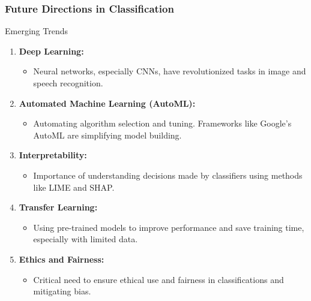 \documentclass[aspectratio=169]{beamer}
\begin{document}
\begin{frame}[fragile]
    \frametitle{Future Directions in Classification}
    \begin{block}{Emerging Trends}
        \begin{enumerate}
            \item \textbf{Deep Learning:} 
            \begin{itemize}
                \item Neural networks, especially CNNs, have revolutionized tasks in image and speech recognition.
            \end{itemize}
            
            \item \textbf{Automated Machine Learning (AutoML):} 
            \begin{itemize}
                \item Automating algorithm selection and tuning. Frameworks like Google’s AutoML are simplifying model building.
            \end{itemize}
            
            \item \textbf{Interpretability:} 
            \begin{itemize}
                \item Importance of understanding decisions made by classifiers using methods like LIME and SHAP.
            \end{itemize}
            
            \item \textbf{Transfer Learning:} 
            \begin{itemize}
                \item Using pre-trained models to improve performance and save training time, especially with limited data.
            \end{itemize}
            
            \item \textbf{Ethics and Fairness:} 
            \begin{itemize}
                \item Critical need to ensure ethical use and fairness in classifications and mitigating bias.
            \end{itemize}
        \end{enumerate}
    \end{block}
\end{frame}
\end{document}
